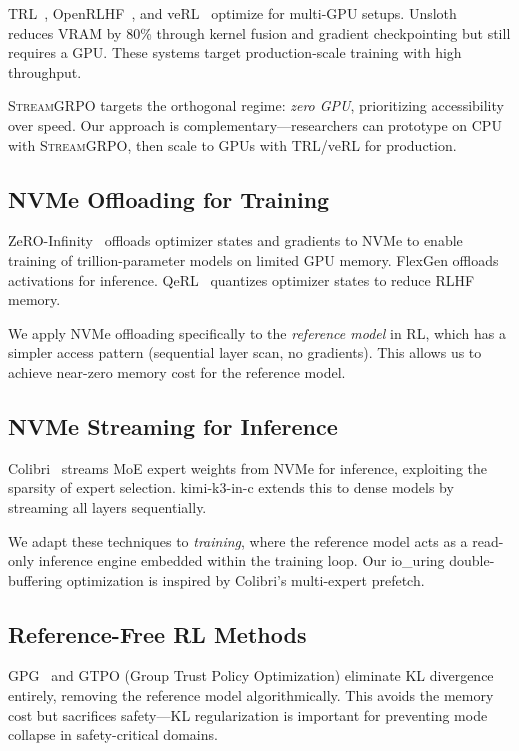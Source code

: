 \documentclass[sigconf,review,anonymous]{acmart}
\begin{document}
TRL~\cite{trl2024}, OpenRLHF~\cite{hu2024openrlhf}, and veRL~\cite{verl2025} optimize for multi-GPU setups. Unsloth~\cite{unsloth2024} reduces VRAM by 80\% through kernel fusion and gradient checkpointing but still requires a GPU. These systems target production-scale training with high throughput.

\textsc{StreamGRPO} targets the orthogonal regime: \emph{zero GPU}, prioritizing accessibility over speed. Our approach is complementary---researchers can prototype on CPU with \textsc{StreamGRPO}, then scale to GPUs with TRL/veRL for production.

\subsection{NVMe Offloading for Training}

ZeRO-Infinity~\cite{rajbhandari2021zero} offloads optimizer states and gradients to NVMe to enable training of trillion-parameter models on limited GPU memory. FlexGen offloads activations for inference. QeRL~\cite{zheng2025qerl} quantizes optimizer states to reduce RLHF memory.

We apply NVMe offloading specifically to the \emph{reference model} in RL, which has a simpler access pattern (sequential layer scan, no gradients). This allows us to achieve near-zero memory cost for the reference model.

\subsection{NVMe Streaming for Inference}

Colibri~\cite{colibri2026} streams MoE expert weights from NVMe for inference, exploiting the sparsity of expert selection. kimi-k3-in-c extends this to dense models by streaming all layers sequentially.

We adapt these techniques to \emph{training}, where the reference model acts as a read-only inference engine embedded within the training loop. Our io\_uring double-buffering optimization is inspired by Colibri's multi-expert prefetch.

\subsection{Reference-Free RL Methods}

GPG~\cite{xie2025gpg} and GTPO (Group Trust Policy Optimization) eliminate KL divergence entirely, removing the reference model algorithmically. This avoids the memory cost but sacrifices safety---KL regularization is important for preventing mode collapse in safety-critical domains.
\end{document}

